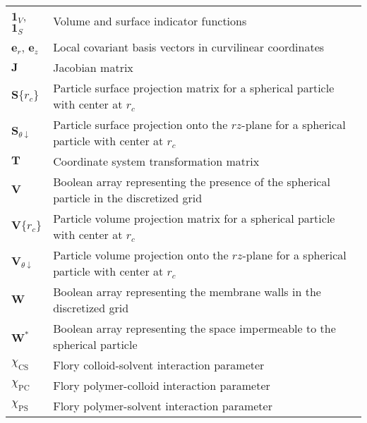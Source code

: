 \documentclass[10pt, a4paper]{article}
\begin{document}
\begin{tabularx}{\linewidth}{l X}
    $\bm{1}_{V}$, $\bm{1}_{S}$ & Volume and surface indicator functions \\
    $\bm{e}_r$, $\bm{e}_z$ & Local covariant basis vectors in curvilinear coordinates \\
    $\bm{J}$ & Jacobian matrix \\
    $\bm{S}\{r_{c}\}$ & Particle surface projection matrix for a spherical particle with center at $r_{c}$ \\
    $\bm{S}_{\theta\downarrow}$ & Particle surface projection onto the $rz$-plane for a spherical particle with center at $r_{c}$ \\
    $\bm{T}$ & Coordinate system transformation matrix \\
    $\bm{V}$ & Boolean array representing the presence of the spherical particle in the discretized grid \\
    $\bm{V}\{r_{c}\}$ & Particle volume projection matrix for a spherical particle with center at $r_{c}$ \\
    $\bm{V}_{\theta\downarrow}$ & Particle volume projection onto the $rz$-plane for a spherical particle with center at $r_{c}$ \\
    $\bm{W}$ & Boolean array representing the membrane walls in the discretized grid \\
    $\bm{W}^{\ast}$ & Boolean array representing the space impermeable to the spherical particle \\
    $\chi_{\text{CS}}$ & Flory colloid-solvent interaction parameter \\
    $\chi_{\text{PC}}$ & Flory polymer-colloid interaction parameter \\
    $\chi_{\textrm{PS}}$ & Flory polymer-solvent interaction parameter \\
\end{tabularx}

\printbibliography
\end{document}
